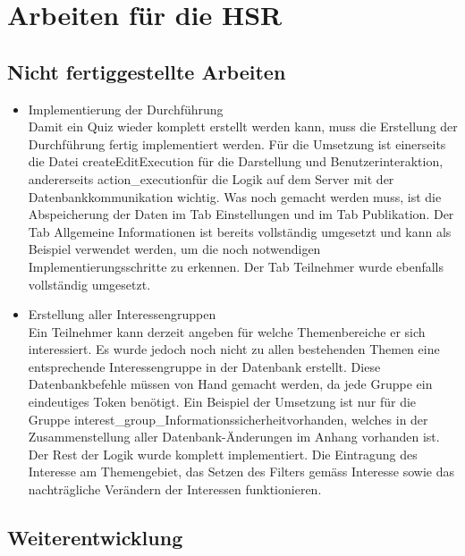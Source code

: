 


\section{Arbeiten für die HSR}

\subsection{Nicht fertiggestellte Arbeiten}

\begin{itemize}
	\item Implementierung der Durchführung\\
	Damit ein Quiz wieder komplett erstellt werden kann, muss die Erstellung der Durchführung fertig implementiert werden. Für die Umsetzung ist einerseits die Datei \glqq createEditExecution \grqq für die Darstellung und Benutzerinteraktion, andererseits \glqq action\_execution\grqq für die Logik auf dem Server mit der Datenbankkommunikation wichtig. Was noch gemacht werden muss, ist die Abspeicherung der Daten im Tab Einstellungen und im Tab Publikation. Der Tab Allgemeine Informationen ist bereits vollständig umgesetzt und kann als Beispiel verwendet werden, um die noch notwendigen Implementierungsschritte zu erkennen. Der Tab Teilnehmer wurde ebenfalls vollständig umgesetzt.
	\item Erstellung aller Interessengruppen\\
	Ein Teilnehmer kann derzeit angeben für welche Themenbereiche er sich interessiert. Es wurde jedoch noch nicht zu allen bestehenden Themen eine entsprechende Interessengruppe in der Datenbank erstellt. Diese Datenbankbefehle müssen von Hand gemacht werden, da jede Gruppe ein eindeutiges Token benötigt. Ein Beispiel der Umsetzung ist nur für die Gruppe \glqq interest\_group\_Informationssicherheit\grqq vorhanden, welches in der Zusammenstellung aller Datenbank-Änderungen im Anhang vorhanden ist. 
	Der Rest der Logik wurde komplett implementiert. Die Eintragung des Interesse am Themengebiet, das Setzen des Filters gemäss Interesse sowie das nachträgliche Verändern der Interessen funktionieren.
\end{itemize}



\subsection{Weiterentwicklung}

